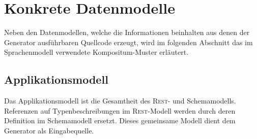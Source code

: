 \section{Konkrete Datenmodelle}
\label{sec:concrete_models}

Neben den Datenmodellen, welche die Informationen beinhalten aus denen der Generator ausführbaren Quellcode erzeugt, wird im folgenden Abschnitt das im Sprachenmodell verwendete Kompositum-Muster erläutert.





\subsection{Applikationsmodell}
\label{sec:application_model}

Das Applikationsmodell ist die Gesamtheit des \textsc{Rest}- und Schemamodells. Referenzen auf Typenbeschreibungen im \textsc{Rest}-Modell werden durch deren Definition im Schemamodell ersetzt. Dieses gemeinsame Modell dient dem Generator als Eingabequelle.

